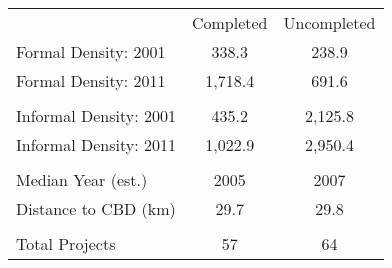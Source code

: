 \begin{tabu}{lcc}
 & Completed & Uncompleted \\ 
 Formal Density: 2001  & 338.3  & 238.9  \\ 
 Formal Density: 2011  & 1,718.4  & 691.6  \\ 
 &  &  \\ 
 Informal Density: 2001  & 435.2  & 2,125.8  \\ 
 Informal Density: 2011  & 1,022.9  & 2,950.4  \\ 
 &  &  \\ 
 Median Year (est.)  & 2005  & 2007  \\ 
 Distance to CBD (km)  & 29.7  & 29.8  \\ 
 &  &  \\ 
 Total Projects   & 57  & 64  \\ 
\bottomrule
\end{tabu}
